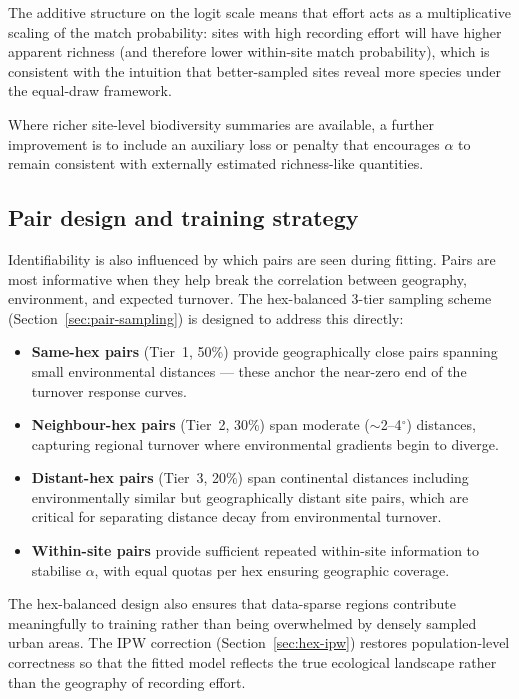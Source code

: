 \documentclass{article}
\begin{document}
The additive structure on the logit scale means that effort acts as a multiplicative scaling of the match probability: sites with high recording effort will have higher apparent richness (and therefore lower within-site match probability), which is consistent with the intuition that better-sampled sites reveal more species under the equal-draw framework.

Where richer site-level biodiversity summaries are available, a further improvement is to include an auxiliary loss or penalty that encourages \(\alpha\) to remain consistent with externally estimated richness-like quantities.

\subsection{Pair design and training strategy}

Identifiability is also influenced by which pairs are seen during fitting. Pairs are most informative when they help break the correlation between geography, environment, and expected turnover. The hex-balanced 3-tier sampling scheme (Section~\ref{sec:pair-sampling}) is designed to address this directly:
\begin{itemize}
    \item \textbf{Same-hex pairs} (Tier~1, 50\%) provide geographically close pairs spanning small environmental distances --- these anchor the near-zero end of the turnover response curves.
    \item \textbf{Neighbour-hex pairs} (Tier~2, 30\%) span moderate ($\sim$2--4$^\circ$) distances, capturing regional turnover where environmental gradients begin to diverge.
    \item \textbf{Distant-hex pairs} (Tier~3, 20\%) span continental distances including environmentally similar but geographically distant site pairs, which are critical for separating distance decay from environmental turnover.
    \item \textbf{Within-site pairs} provide sufficient repeated within-site information to stabilise $\alpha$, with equal quotas per hex ensuring geographic coverage.
\end{itemize}

The hex-balanced design also ensures that data-sparse regions contribute meaningfully to training rather than being overwhelmed by densely sampled urban areas. The IPW correction (Section~\ref{sec:hex-ipw}) restores population-level correctness so that the fitted model reflects the true ecological landscape rather than the geography of recording effort.
\end{document}
